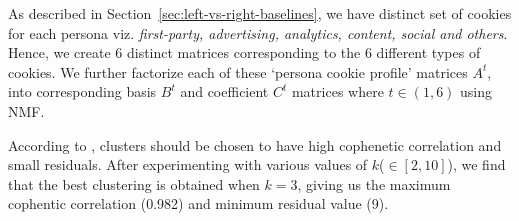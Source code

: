 \documentclass{article}
\newcommand{\hpws}{HPWs\xspace}
\newcommand{\leftPrices}{\$0.561\xspace}
\newcommand{\rightPrices}{\$0.667\xspace}
\newcommand{\diffPrices}{5$\times$\xspace}
\begin{document}
As described in Section~\ref{sec:left-vs-right-baselines}, we have distinct set of cookies for each persona viz. \emph{first-party, advertising, analytics, content, social and others}.
Hence, we create 6 distinct matrices corresponding to the 6 different types of cookies.
We further factorize each of these `persona cookie profile' matrices $A^t$, into corresponding basis $B^t$ and coefficient $C^t$ matrices where  $t\in(1,6)$ using NMF.

According to  \cite{brunet2004metagenes,hutchins2008position}, clusters should be chosen to have high cophenetic correlation and small residuals. 
After experimenting with various values of $k$($\in[2,10]$), we find that the best clustering is obtained when $k=3$, giving us the maximum cophentic correlation (0.982) and minimum residual value (9).



\begin{figure*}[thb]
    \centering
    \caption{(a) Cookie synchronizations per \hpws for the different personas.
        For the vast majority of personas, the persona visiting $W^R$ receives more cookie synchronizations than the one visiting $W^L$.
        (b) Distribution of prices in CPM paid by advertisers to deliver ads to personas.
        The median price for $W^L$ is \leftPrices CPM, and the median price for $W^R$ is \rightPrices CPM.
        Considering the top 25\% most expensive ads, $W^R$ got (up to \diffPrices) higher ad-prices than $W^L$.
        (c) Heat-map with the KS statistic of 2-sample KS test for all pairwise comparisons between distributions of paid prices per persona, and visited $W^L$ and $W^R$.
        All cells with $p\geq 0.01$ are whited out; only cells with $p<0.01$ are colored.}
\end{figure*}
\end{document}
